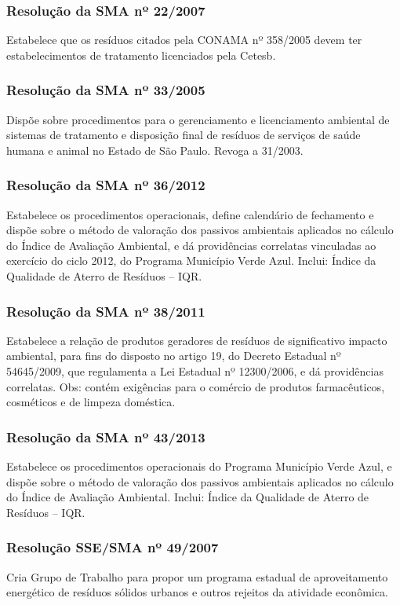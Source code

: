 \begin{subapend}
\begin{subsubapend}
		\subsubsection{Resolução da SMA nº 22/2007}
		Estabelece que os resíduos citados pela CONAMA nº 358/2005 devem ter estabelecimentos de tratamento licenciados pela Cetesb.
		\subsubsection{Resolução da SMA nº 33/2005}
		Dispõe sobre procedimentos para o gerenciamento e licenciamento ambiental de sistemas de tratamento e disposição final de resíduos de serviços de saúde humana e animal no Estado de São Paulo. Revoga a 31/2003.
		\subsubsection{Resolução da SMA nº 36/2012}
		Estabelece os procedimentos operacionais, define calendário de fechamento e dispõe sobre o método de valoração dos passivos ambientais aplicados no cálculo do Índice de Avaliação Ambiental, e dá providências correlatas vinculadas ao exercício do ciclo 2012, do Programa Município Verde Azul. Inclui: Índice da Qualidade de Aterro de Resíduos – IQR.
		\subsubsection{Resolução da SMA nº 38/2011}
		Estabelece a relação de produtos geradores de resíduos de significativo impacto ambiental, para fins do disposto no artigo 19, do Decreto Estadual nº 54645/2009, que regulamenta a Lei Estadual nº 12300/2006, e dá providências correlatas. Obs: contém exigências para o comércio de produtos farmacêuticos, cosméticos e de limpeza doméstica.
		\subsubsection{Resolução da SMA nº 43/2013}
		Estabelece os procedimentos operacionais do Programa Município Verde Azul, e dispõe sobre o método de valoração dos passivos ambientais aplicados no cálculo do Índice de Avaliação Ambiental. Inclui: Índice da Qualidade de Aterro de Resíduos – IQR.
		\subsubsection{Resolução SSE/SMA nº 49/2007}
		Cria Grupo de Trabalho para propor um programa estadual de aproveitamento energético de resíduos sólidos urbanos e outros rejeitos da atividade econômica.

\end{subsubapend}
\end{subapend}
